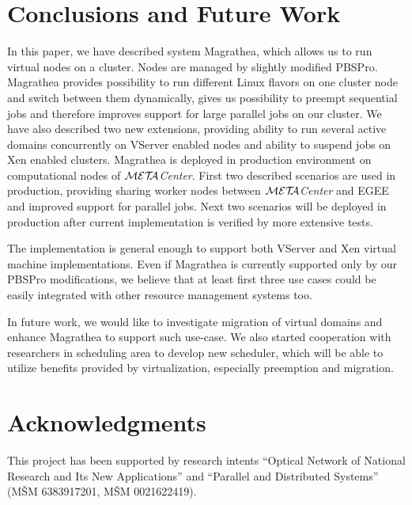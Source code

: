 \documentclass{sig-alternate}
\def\META#1{\textit{${\cal MET\!\!A}$#1}}
\begin{document}
\section{Conclusions and Future Work}

In this paper, we have described system Magrathea, which allows us to run virtual nodes on a cluster. Nodes are managed
by slightly modified PBSPro. Magrathea provides possibility to run different Linux flavors on one cluster node and
switch between them dynamically, gives us possibility to preempt
sequential jobs and therefore improves support for large
parallel jobs on our cluster. We have also described two new extensions, providing ability to run several active
domains concurrently on VServer enabled nodes and ability to suspend jobs on Xen enabled clusters.
Magrathea is deployed in production environment on computational nodes of
\META{Center}. First two described scenarios are used in production, providing 
sharing worker nodes between \META{Center} and EGEE and improved support for 
parallel jobs. Next two scenarios will be deployed in production after 
current implementation is verified by more extensive tests.

The implementation is general enough to support both VServer and Xen virtual machine implementations. Even if Magrathea 
is currently supported only by our PBSPro modifications, we believe that at least first three use cases could be 
easily integrated with other resource management systems too.

In future work, we would like to investigate migration of virtual domains and enhance Magrathea to support such
use-case. We also started cooperation with researchers in scheduling area to develop new scheduler, which will be able
to utilize benefits provided by virtualization, especially preemption and migration.

\section*{Acknowledgments}

This project has been supported by research intents ``Optical Network of
National Research and Its New Applications'' and ``Parallel and Distributed
Systems'' (M\v{S}M 6383917201, M\v{S}M 0021622419).



\end{document}
